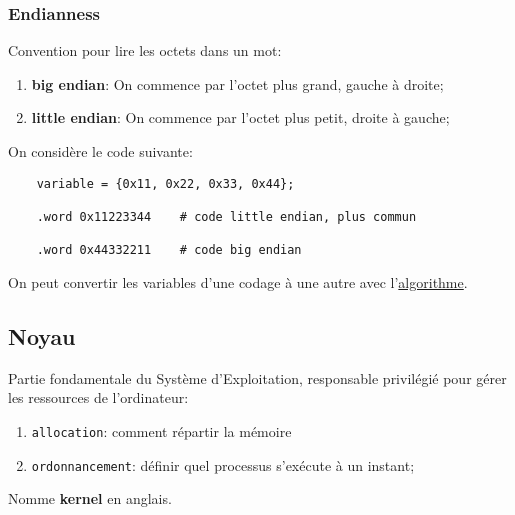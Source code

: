 \documentclass{article}
\begin{document}
\subsubsection{Endianness}
\begin{definition}\label{def:endianness}
    Convention pour lire les octets dans un mot:
    \begin{enumerate}[noitemsep]
        \item \textbf{big endian}: On commence par l'octet plus grand, gauche à droite;
        \item \textbf{little endian}: On commence par l'octet plus petit, droite à gauche;
    \end{enumerate}
    
    \begin{example}
        On considère le code suivante:
        \begin{scriptsize}\myRISCV
            \begin{lstlisting}
    variable = {0x11, 0x22, 0x33, 0x44};
    
    .word 0x11223344    # code little endian, plus commun
    
    .word 0x44332211    # code big endian
            \end{lstlisting}
        \end{scriptsize}
    \end{example}

    On peut convertir les variables d'une codage à une autre avec l'\href{https://codereview.stackexchange.com/questions/151049/endianness-conversion-in-c}{algorithme}.
\end{definition}


\subsection{Noyau}
\begin{definition}\label{def:noyau}
    Partie fondamentale du Système d'Exploitation, responsable privilégié pour gérer les ressources de l'ordinateur:
    \begin{enumerate}[noitemsep]
        \item \texttt{allocation}: comment répartir la mémoire
        \item \texttt{ordonnancement}: définir quel processus s'exécute à un instant;
    \end{enumerate}
    
    \begin{remark}
        Nomme \textbf{kernel} en anglais.
    \end{remark}
\end{definition}
\end{document}

